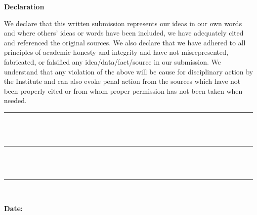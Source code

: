 \documentclass[12pt]{article}
\begin{document}
\begin{center}
  {\Large \textbf{Declaration}}
\end{center}

\vspace{0.5cm}

\justifying

We declare that this written submission represents our ideas in our own
words and where others' ideas or words have been included, we have adequately
cited and referenced the original sources. We also declare that we have adhered to
all principles of academic honesty and integrity and have not misrepresented,
fabricated, or falsified any idea/data/fact/source in our submission. We understand
that any violation of the above will be cause for disciplinary action by the Institute
and can also evoke penal action from the sources which have not been properly
cited or from whom proper permission has not been taken when needed.

\vspace{2cm}

\begin{flushright}
    \rule{6cm}{0.5pt} \\[-0.4cm]
     \\[0.5cm]
    \rule{6cm}{0.5pt} \\[-0.4cm]
     \\[0.5cm]
    \rule{6cm}{0.5pt} \\[-0.4cm]
\end{flushright}

\vfill

\noindent \textbf{Date:} \\[2em]
\end{document}
